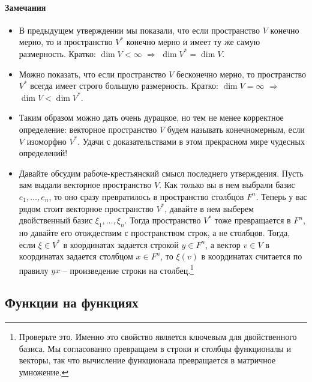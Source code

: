\paragraph{Замечания}
\begin{itemize}
\item В предыдущем утверждении мы показали, что если пространство $V$ конечно мерно, то и пространство $V^*$ конечно мерно и имеет ту же самую размерность. Кратко:  $\dim V <\infty$ $\Rightarrow$ $\dim V^* = \dim V$.

\item Можно показать, что если пространство $V$ бесконечно мерно, то пространство $V^*$ всегда имеет строго большую размерность. Кратко: $\dim V = \infty$ $\Rightarrow$ $\dim V < \dim V^*$.

\item Таким образом можно дать очень дурацкое, но тем не менее корректное определение: векторное пространство $V$ будем называть конечномерным, если $V$ изоморфно $V^*$. Удачи с доказательствами в этом прекрасном мире чудесных определений!

\item Давайте обсудим рабоче-крестьянский смысл последнего утверждения. Пусть вам выдали векторное пространство $V$. Как только вы в нем выбрали базис $e_1,\ldots,e_n$, то оно сразу превратилось в пространство столбцов $F^n$. Теперь у вас рядом стоит векторное пространство $V^*$, давайте в нем выберем двойственный базис $\xi_1,\ldots,\xi_n$. Тогда пространство $V^*$ тоже превращается в $F^n$, но давайте его отождествим с пространством строк, а не столбцов. Тогда, если $\xi \in V^*$ в координатах задается строкой $y\in F^n$, а вектор $v\in V$ в координатах задается столбцом $x\in F^n$, то $\xi(v)$ в координатах считается по правилу $yx$ -- произведение строки на столбец.\footnote{Проверьте это. Именно это свойство является ключевым для двойственного базиса. Мы согласованно превращаем в строки и столбцы функционалы и векторы, так что вычисление функционала превращается в матричное умножение.}
\end{itemize}

\subsection{Функции на функциях}

